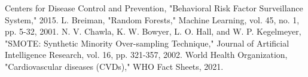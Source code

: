 \documentclass[conference]{IEEEtran}
\begin{document}
\begin{thebibliography}{1}
 Centers for Disease Control and Prevention, "Behavioral Risk Factor Surveillance System," 2015.
 L. Breiman, "Random Forests," Machine Learning, vol. 45, no. 1, pp. 5-32, 2001.
 N. V. Chawla, K. W. Bowyer, L. O. Hall, and W. P. Kegelmeyer, "SMOTE: Synthetic Minority Over-sampling Technique," Journal of Artificial Intelligence Research, vol. 16, pp. 321-357, 2002.
 World Health Organization, "Cardiovascular diseases (CVDs)," WHO Fact Sheets, 2021.
\end{thebibliography}
\end{document}
